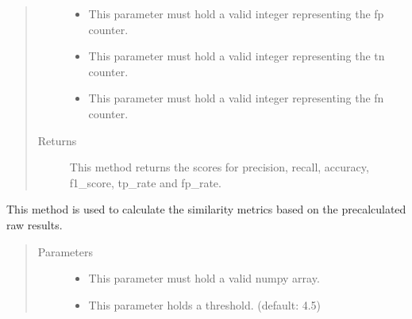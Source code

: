 \documentclass[letterpaper,10pt,english,openany,oneside]{sphinxmanual}
\begin{document}
\begin{fulllineitems}
\begin{fulllineitems}
\begin{quote}
\begin{description}
\begin{itemize}
\item {} 
 \textendash{} This parameter must hold a valid integer representing the fp counter.

\item {} 
 \textendash{} This parameter must hold a valid integer representing the tn counter.

\item {} 
 \textendash{} This parameter must hold a valid integer representing the fn counter.

\end{itemize}

\item[{Returns}] \leavevmode
This method returns the scores for precision, recall, accuracy, f1\_score, tp\_rate and fp\_rate.

\end{description}\end{quote}

\end{fulllineitems}


\begin{fulllineitems}
\label{\detokenize{Evaluation:sbd.Evaluation.Evaluation.calculateSimilarityMetric}}
This method is used to calculate the similarity metrics based on the pre\sphinxhyphen{}calculated raw results.
\begin{quote}\begin{description}
\item[{Parameters}] \leavevmode\begin{itemize}
\item {} 
 \textendash{} This parameter must hold a valid numpy array.

\item {} 
 \textendash{} This parameter holds a threshold. (default: 4.5)

\end{itemize}


\end{description}
\end{quote}
\end{fulllineitems}
\end{fulllineitems}
\end{document}
